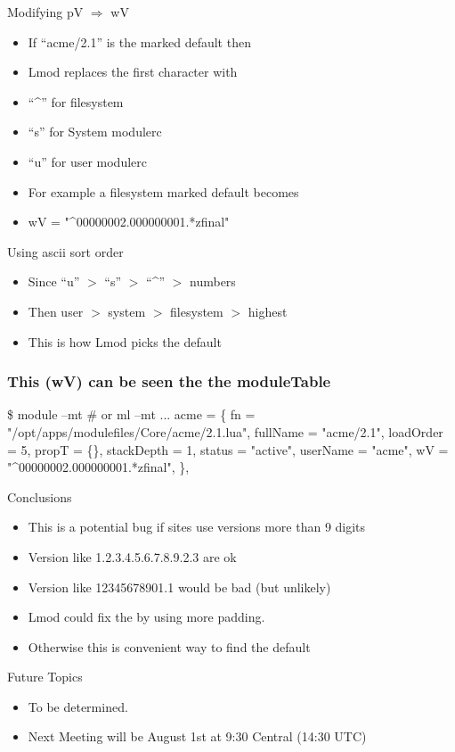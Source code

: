 \documentclass{beamer}
\begin{document}
\begin{frame}{Modifying pV $\Rightarrow$ wV}
  \begin{itemize}
    \item If ``acme/2.1'' is the marked default then 
    \item Lmod replaces the first character with 
    \item ``\^{}'' for filesystem
    \item ``s'' for System modulerc
    \item ``u'' for user modulerc
    \item For example a filesystem marked default becomes
    \item wV = "\^{}00000002.000000001.*zfinal"
  \end{itemize}
\end{frame}

\begin{frame}{Using ascii sort order}
  \begin{itemize}
    \item Since ``u'' $>$ ``s'' $>$ ``\^{}'' $>$ numbers
    \item Then user $>$ system $>$ filesystem $>$ highest
    \item This is how Lmod picks the default
  \end{itemize}
\end{frame}

\begin{frame}[fragile]
    \frametitle{This (wV) can be seen the the moduleTable}
 {\tiny
    \begin{semiverbatim}
    \$ module --mt # or ml --mt
    ...
    acme = \{
      fn = "/opt/apps/modulefiles/Core/acme/2.1.lua",
      fullName = "acme/2.1",
      loadOrder = 5,
      propT = \{\},
      stackDepth = 1,
      status = "active",
      userName = "acme",
      wV = "^00000002.000000001.*zfinal",
    \},
        
    \end{semiverbatim}
}
\end{frame}

\begin{frame}{Conclusions}
  \begin{itemize}
    \item This is a potential bug if sites use versions more than 9
      digits
    \item Version like 1.2.3.4.5.6.7.8.9.2.3 are ok
    \item Version like 12345678901.1 would be bad (but unlikely)
    \item Lmod could fix the by using more padding.
    \item Otherwise this is convenient way to find the default
  \end{itemize}
\end{frame}

\begin{frame}{Future Topics}
  \begin{itemize}
    \item To be determined.
    \item Next Meeting will be August 1st at 9:30 Central (14:30 UTC)
  \end{itemize}
\end{frame}
\end{document}
